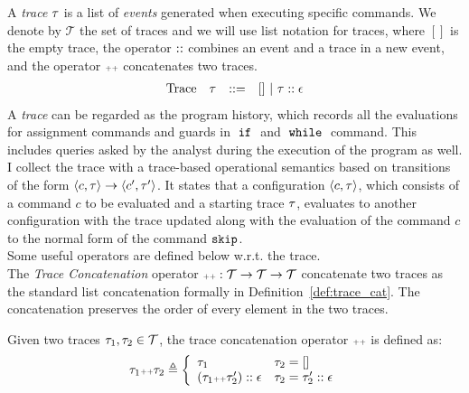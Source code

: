  A \emph{trace}
 $\mathtt{\tau}$ is a list of \emph{events} generated when executing specific commands. We denote by $\mathcal{T}$ the set of traces and we will use list notation for traces, where $[]$ is the empty trace, the operator ${\small ::}$ combines an event and a trace in a new event, 
 and the operator ${\scriptscriptstyle ++}$ concatenates two traces. 
 \[
\begin{array}{llll}
\mbox{Trace} & \mathtt{\tau}
& ::= & [] ~|~ \mathtt{\tau} :: \mathtt{\epsilon}
\end{array}
\]
A \emph{trace} can be regarded as the program history, 
which records all the evaluations for assignment commands and guards in $\;\mathtt{if}\;$ and $\;\mathtt{while}\;$ command.
This includes queries asked by the analyst during the execution of the program as well. 
I collect the trace with a trace-based operational semantics based on transitions 
of the form $ \langle c, \mathtt{\tau} \rangle \to \langle c', \mathtt{\tau}' \rangle $. 
It states that a configuration $\langle c, \mathtt{\tau} \rangle$,
which consists of a command $c$ to be evaluated and a starting trace $\mathtt{\tau}$, 
evaluates to another configuration with the trace updated along with the evaluation of the command $c$ to the normal form of the command $\mathtt{skip}$.
%
\\
Some useful operators are defined below w.r.t. the trace.
\\
The \emph{Trace Concatenation} operator ${\scriptscriptstyle ++}: \mathcal{T} \to \mathcal{T} \to \mathcal{T}$ concatenate two traces
as the standard list concatenation formally
in Definition~\ref{def:trace_cat}.
The concatenation preserves the order of every element in the two traces.
\begin{defn}
  \label{def:trace_cat}
  Given two traces $\mathtt{\tau}_1, \mathtt{\tau}_2 \in \mathcal{T}$, the trace concatenation operator 
  ${\scriptscriptstyle ++}$ is defined as:
  \[
    \trace_1 \tracecat \trace_2 \triangleq
    \left\{
    \begin{array}{ll} 
       \trace_1 & \trace_2 = [] \\
       (\trace_1  \tracecat \trace_2')  :: \event & \trace_2 = \trace_2' :: \event
    \end{array}
    \right.
  \]
  \end{defn}
  
